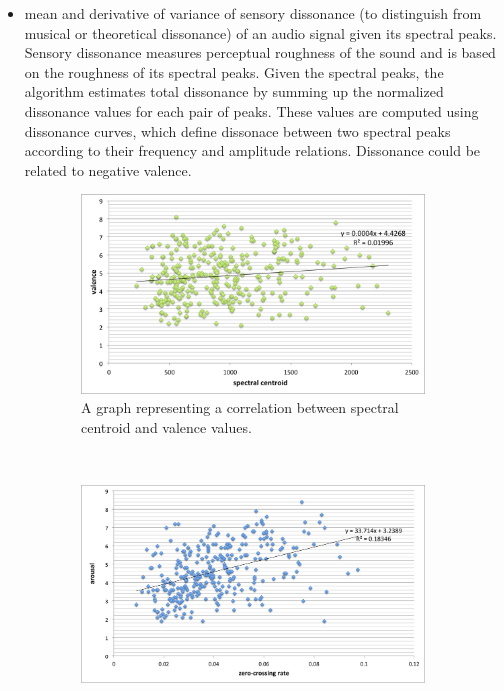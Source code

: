 \begin{itemize}
\item mean and derivative of variance of sensory dissonance (to distinguish from musical or theoretical dissonance) of an audio signal given its spectral peaks. Sensory dissonance measures perceptual roughness of the sound and is based on the roughness of its spectral peaks. Given the spectral peaks, the algorithm estimates total dissonance by summing up the normalized dissonance values for each pair of peaks. These values are computed using dissonance curves, which define dissonace between two spectral peaks according to their frequency and amplitude relations. Dissonance could be related to negative valence.

\end{itemize}

\begin{figure}
        \centering
        \begin{subfigure}[b]{0.48\textwidth}
                \includegraphics[width=\textwidth]{Figures/spectralcentroid-valence}
                \caption{A graph representing a correlation between spectral centroid and valence values.}
                \label{fig:is }
        \end{subfigure}%
        ~ %
        \begin{subfigure}[b]{0.48\textwidth}
                \includegraphics[width=\textwidth]{Figures/zerocrossing-arousal}

\end{subfigure}
\end{figure}
